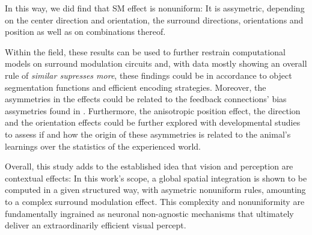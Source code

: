 
In this way, we did find that SM effect is nonuniform: It is assymetric, depending on the center direction and orientation, the surround directions, orientations and position as well as on combinations thereof. 

Within the field, these results can be used to further restrain computational models on surround modulation circuits and, with data mostly showing an overall rule of \textit{similar supresses more}, these findings could be in accordance to object segmentation functions and efficient encoding strategies. Moreover, the asymmetries in the effects could be related to the feedback connections' bias assymetries found in \cite{Marques2018}. Furthermore, the anisotropic position effect, the direction and the orientation effects could be further explored with developmental studies to assess if and how the origin of these asymmetries is related to the animal's learnings over the statistics of the experienced world.

Overall, this study adds to the established idea that vision and perception are contextual effects: In this work's scope, a global spatial integration is shown to be computed in a given structured way, with asymetric nonuniform rules, amounting to a complex surround modulation effect. This complexity and nonuniformity are fundamentally ingrained as neuronal non-agnostic mechanisms that ultimately deliver an extraordinarily efficient visual percept.

\cleardoublepage